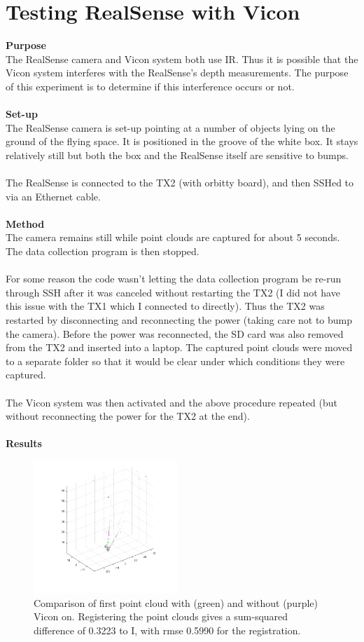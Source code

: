 \documentclass[12pt,a4paper]{article}
\begin{document}
\section{Testing RealSense with Vicon}
\textbf{Purpose} \\
The RealSense camera and Vicon system both use IR. Thus it is possible that the Vicon system interferes with the RealSense's depth measurements. The purpose of this experiment is to determine if this interference occurs or not.
\\\\
\textbf{Set-up} \\
The RealSense camera is set-up pointing at a number of objects lying on the ground of the flying space. It is positioned in the groove of the white box. It stays relatively still but both the box and the RealSense itself are sensitive to bumps.
\\\\
The RealSense is connected to the TX2 (with orbitty board), and then SSHed to via an Ethernet cable. 
\\\\
\textbf{Method} \\
The camera remains still while point clouds are captured for about 5 seconds. The data collection program is then stopped. 
\\\\
For some reason the code wasn't letting the data collection program be re-run through SSH after it was canceled without restarting the TX2 (I did not have this issue with the TX1 which I connected to directly). Thus the TX2 was restarted by disconnecting and reconnecting the power (taking care not to bump the camera). Before the power was reconnected, the SD card was also removed from the TX2 and inserted into a laptop. The captured point clouds were moved to a separate folder so that it would be clear under which conditions they were captured.
\\\\
The Vicon system was then activated and the above procedure repeated (but without reconnecting the power for the TX2 at the end).
\\\\
\textbf{Results} \\
	\begin{figure}[h]
		\centering
		\includegraphics[height=50mm, trim = 20mm 20mm 20mm 20mm, clip]{first_frame_compare.png}
		\caption{Comparison of first point cloud with (green) and without (purple) Vicon on. Registering the point clouds gives a sum-squared difference of 0.3223 to I, with rmse 0.5990 for the registration.}
		\label{f: vicon first frame}
	\end{figure}
\end{document}

